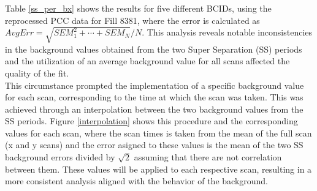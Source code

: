 Table  \ref{ss_per_bx} shows the results for five different BCIDs, using the reprocessed PCC data for Fill 8381, where the error is calculated as $AvgErr=\sqrt{SEM_1^2 + \cdots + SEM_N}/N$. This analysis reveals notable inconsistencies in the background values obtained from the two Super Separation (SS) periods and the utilization of an average background value for all scans affected the quality of the fit.\\ 

This circumstance prompted the implementation of a specific background value for each scan, corresponding to the time at which the scan was taken. This was achieved through an interpolation between the two background values from the SS periods. Figure \ref{interpolation} shows this procedure and the corresponding values for each scan, where the scan  times is taken from the  mean of the full scan (x and y scans) and the error asigned to these values is the mean of the two SS background errors divided by $\sqrt{2}$ assuming that there are not correlation between them. These values will be applied to each respective scan, resulting in a more consistent analysis aligned with the behavior of the background.

